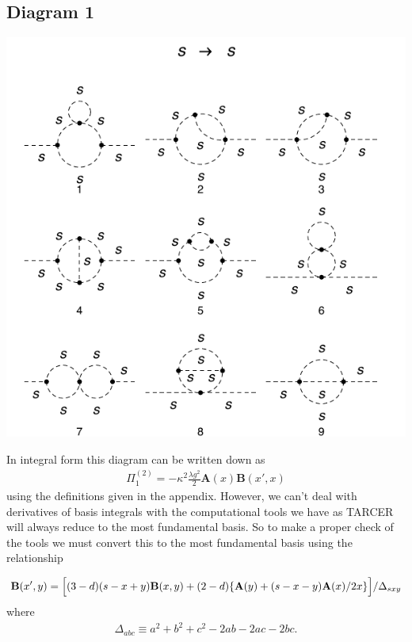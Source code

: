 \documentclass[11pt]{article}
\newcommand{\tarcer}{\textsf{TARCER} }
\begin{document}
\subsection*{Diagram 1}
\noindent\begin{minipage}{0.3\textwidth}
\begin{center}
\includegraphics{2loop_1.pdf}\\
\end{center}
\end{minipage}
\noindent\begin{minipage}{0.7\textwidth}
In integral form this diagram can be written down as
\begin{align}
\Pi^{(2)}_1=-\kappa^2\frac{\lambda g^2}{2}\mathbf{A}(x)\mathbf{B}(x',x)\label{eqn:scalar_2a}
\end{align}
using the definitions given in the appendix.  However, we can't deal with derivatives of basis integrals with the computational tools we have as \tarcer will always reduce to the most fundamental basis.  So to make a proper check of the tools we must convert this to the most fundamental basis using the relationship
\end{minipage}
\begin{align}
{\bf B}(x',y) = 
\Bigl [ (3-d) (s-x+y) {\bf B}(x,y) + (2-d) \lbrace 
{\bf A}(y) 
+ (s-x-y){\bf A}(x)/2x \rbrace \Bigr ]/\Delta_{sxy} \label{eqn:deltaxyz}
\end{align}
where
\begin{align}
\Delta_{abc} \equiv a^2 + b^2 + c^2 - 2 a b - 2 a c - 2 b c.
\end{align}
\end{document}
